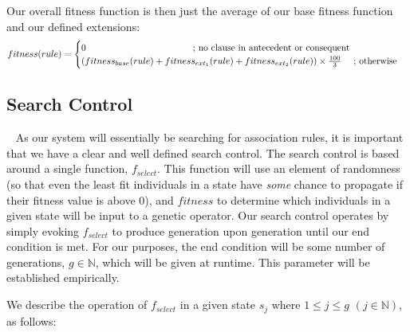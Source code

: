 \documentclass{amsart}
\theoremstyle{definition}
\theoremstyle{remark}
\numberwithin{equation}{section}
\begin{document}
\noindent Our overall fitness function is then just the average of our base fitness function and our defined extensions:\small
\[
  fitness(rule)=
  \begin{cases}
                                   0  \text{\hspace{4.1cm}; no clause in antecedent or consequent} \\
                                   (fitness_{base}(rule) + fitness_{ext_1}(rule) + fitness_{ext_2}(rule))\times \frac{100}{3} \text{~~~~; otherwise} \\
  \end{cases}
\]
\newline
\subsection{Search Control}
~\newline
\normalsize
As our system will essentially be {searching} for association rules, it is important that we have a clear and well defined search control. The search control is based around a single function, $f_{select}$. This function will use an element of randomness (so that even the least fit individuals in a state have \textit{some} chance to propagate if their fitness value is above 0), and $fitness$ to determine which individuals in a given state will be input to a genetic operator. Our search control operates by simply evoking $f_{select}$ to produce generation upon generation until our end condition is met. For our purposes, the end condition will be some number of generations, $g\in \mathbb{N}$, which will be given at runtime. This parameter will be established empirically. 
\newline

We describe the operation of $f_{select}$ in a given state $s_j$ where $1\leq j \leq g$ $(j\in\mathbb{N})$, as follows:
\end{document}
